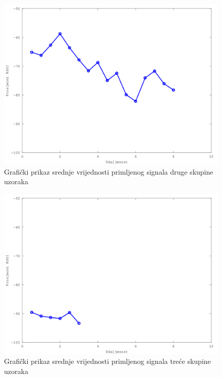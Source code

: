 \begin{figure}[H]
    \centering
    \includegraphics[scale=0.62]{pictures/druga-skupina-uzoraka}
    \caption{Grafički prikaz srednje vrijednosti primljenog signala druge skupine uzoraka}
    \label{fig:druga_skupina}
\end{figure}

\begin{figure}[H]
    \centering
    \includegraphics[scale=0.62]{pictures/treca-skupina-uzoraka}
    \caption{Grafički prikaz srednje vrijednosti primljenog signala treće skupine uzoraka}
    \label{fig:treca_skupina}
\end{figure}

